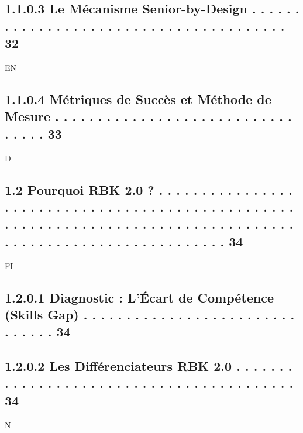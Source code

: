 \subsection{1.1.0.3           Le Mécanisme Senior-by-Design . . . . . . . . . . . . . . . . . . . . . . . . . . . . . . . . . . . . . . .                                                                                                                32}
\vspace{0.5em}
\vspace{0.5em}
\vspace{0.5em}
\vspace{0.5em}
EN\\
\subsection{1.1.0.4           Métriques de Succès et Méthode de Mesure . . . . . . . . . . . . . . . . . . . . . . . . . . . . . . . . .                                                                                                                 33}
\vspace{0.5em}
\vspace{0.5em}
\vspace{0.5em}
\vspace{0.5em}
D\\
\subsection{1.2     Pourquoi RBK 2.0 ? . . . . . . . . . . . . . . . . . . . . . . . . . . . . . . . . . . . . . . . . . . . . . . . . . . . . . . . . . . . . . . . . . . . . . . . . . . . . . . . . . . . . . . . . . . . . . . . . . . . . . . . . . . . . . . 34}
\vspace{0.5em}
\vspace{0.5em}
\vspace{0.5em}
\vspace{0.5em}
FI\\
\subsection{1.2.0.1 Diagnostic : L’Écart de Compétence (Skills Gap) . . . . . . . . . . . . . . . . . . . . . . . . . . . . . . .                                                                                                                        34}
\subsection{1.2.0.2 Les Différenciateurs RBK 2.0 . . . . . . . . . . . . . . . . . . . . . . . . . . . . . . . . . . . . . . . . .                                                                                                                       34}
N\\
